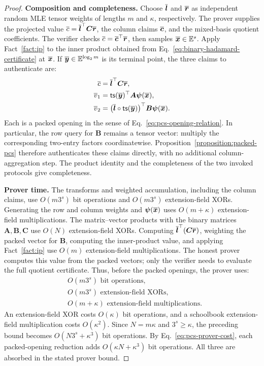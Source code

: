\begin{proof}
\noindent\textbf{Composition and completeness.}
Choose \(\overline{\bm l}\) and \(\overline{\bm r}\) as independent
random MLE tensor weights of lengths \(m\) and \(\kappa\),
respectively. The prover supplies the projected value
\(\overline{c}=\overline{\bm l}^{\top}\bm C\overline{\bm r}\), the column
claims \(\overline{\bm c}\), and the mixed-basis quotient coefficients.
The verifier checks \(\overline{c}=\overline{\bm c}^{\top}\overline{\bm r}\),
then samples \(\overline{\bm x}\in\mathbb{E}^s\).
Apply Fact~\ref{fact:ip} to the inner product obtained from
Eq.~\eqref{eq:binary-hadamard-certificate} at \(\overline{\bm x}\).
If \(\overline{\bm y}\in\mathbb{E}^{\log_2m}\) is its terminal
point, the three claims to authenticate are:
\[
\begin{aligned}
    \overline{c}
      &=\overline{\bm l}^{\top}\bm C\overline{\bm r},\\
    \overline{v}_1
      &={\sf ts}(\overline{\bm y})^{\top}
          \bm A\bm\psi(\overline{\bm x}),\\
    \overline{v}_2
      &=\bigl(\overline{\bm l}\circ
          {\sf ts}(\overline{\bm y})\bigr)^{\top}
          \bm B\bm\psi(\overline{\bm x}).
\end{aligned}
\]
Each is a packed opening in the sense of
Eq.~\eqref{eq:pcs-opening-relation}.
In particular, the row query for \(\bm B\) remains a tensor
vector: multiply the corresponding two-entry factors
coordinatewise. Proposition~\ref{proposition:packed-pcs}
therefore authenticates these claims directly, with no additional
column-aggregation step. The product identity and the
completeness of the two invoked protocols give completeness.

\smallskip\noindent\textbf{Prover time.}
The transforms and weighted accumulation, including the column
claims, use \(O(m3^s)\) bit operations and
\(O(m3^s)\) extension-field XORs.
Generating the row and column weights and
\(\bm\psi(\overline{\bm x})\) uses \(O(m+\kappa)\)
extension-field multiplications.
The matrix--vector products with the binary matrices
\(\bm A,\bm B,\bm C\) use \(O(N)\) extension-field XORs.
Computing \(\overline{\bm l}^{\top}(\bm C\overline{\bm r})\),
weighting the packed vector for \(\bm B\), computing the
inner-product value, and applying Fact~\ref{fact:ip} use
\(O(m)\) extension-field multiplications.
The honest prover computes this value from the packed vectors;
only the verifier needs to evaluate the full quotient certificate.
Thus, before the packed openings, the prover uses:
\[
\begin{aligned}
    &O(m3^s)\text{ bit operations},\\
    &O(m3^s)\text{ extension-field XORs},\\
    &O(m+\kappa)\text{ extension-field multiplications}.
\end{aligned}
\]
An extension-field XOR costs \(O(\kappa)\) bit operations,
and a schoolbook extension-field multiplication costs
\(O(\kappa^2)\). Since \(N=m\kappa\) and \(3^s\geq\kappa\),
the preceding bound becomes \(O(N3^s+\kappa^3)\) bit operations.
By Eq.~\eqref{eq:pcs-prover-cost}, each packed-opening reduction
adds \(O(\kappa N+\kappa^3)\) bit operations.
All three are absorbed in the stated prover bound.


\end{proof}
